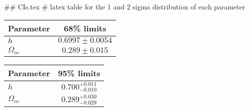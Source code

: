 ## CIs.tex
# latex table for the 1 and 2 sigma distribution of each parameter

\begin{tabular} { l  c}
 Parameter &  68\% limits\\
\hline
{\boldmath$h              $} & $0.6997\pm 0.0054          $\\
{\boldmath$\Omega_m       $} & $0.289\pm 0.015            $\\
\hline
\end{tabular}

\begin{tabular} { l  c}
 Parameter &  95\% limits\\
\hline
{\boldmath$h              $} & $0.700^{+0.011}_{-0.010}   $\\
{\boldmath$\Omega_m       $} & $0.289^{+0.030}_{-0.029}   $\\
\hline
\end{tabular}
